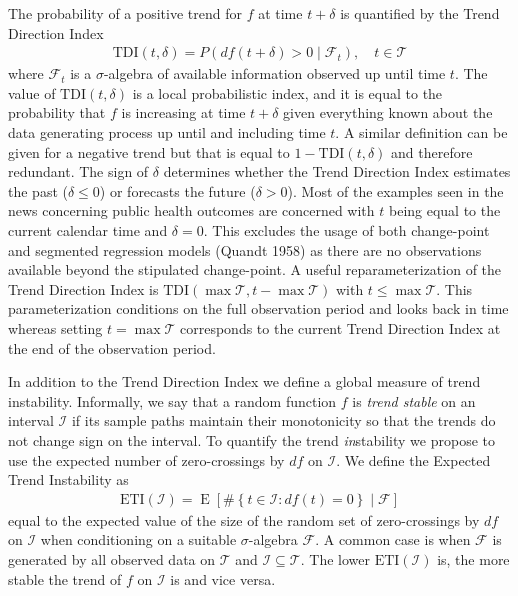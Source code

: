 \documentclass[
  11pt,
]{article}
\theoremstyle{nonumberplain}
\begin{document}
The probability of a positive trend for \(f\) at time \(t + \delta\) is
quantified by the Trend Direction Index \begin{align}
  \mathrm{TDI}(t, \delta) = P(df(t + \delta ) > 0 \mid \mathcal{F}_t), \quad t \in \mathcal{T}\label{eq:TCIdef}
\end{align} where \(\mathcal{F}_t\) is a \(\sigma\)-algebra of available
information observed up until time \(t\). The value of
\(\mathrm{TDI}(t, \delta)\) is a local probabilistic index, and it is
equal to the probability that \(f\) is increasing at time \(t + \delta\)
given everything known about the data generating process up until and
including time \(t\). A similar definition can be given for a negative
trend but that is equal to \(1 - \mathrm{TDI}(t, \delta)\) and therefore
redundant. The sign of \(\delta\) determines whether the Trend Direction
Index estimates the past (\(\delta \leq 0\)) or forecasts the future
(\(\delta > 0\)). Most of the examples seen in the news concerning
public health outcomes are concerned with \(t\) being equal to the
current calendar time and \(\delta = 0\). This excludes the usage of
both change-point and segmented regression models (Quandt 1958) as there
are no observations available beyond the stipulated change-point. A
useful reparameterization of the Trend Direction Index is
\(\mathrm{TDI}(\max \mathcal{T}, t - \max \mathcal{T})\) with
\(t \leq \max \mathcal{T}\). This parameterization conditions on the
full observation period and looks back in time whereas setting
\(t = \max \mathcal{T}\) corresponds to the current Trend Direction
Index at the end of the observation period.

In addition to the Trend Direction Index we define a global measure of
trend instability. Informally, we say that a random function \(f\) is
\textit{trend stable} on an interval \(\mathcal{I}\) if its sample paths
maintain their monotonicity so that the trends do not change sign on the
interval. To quantify the trend \emph{in}stability we propose to use the
expected number of zero-crossings by \(df\) on \(\mathcal{I}\). We
define the Expected Trend Instability as \begin{align}
  \text{ETI}(\mathcal{I}) = \mathop{\mathrm{E}}\left[\#\left\{t \in \mathcal{I} : df(t) = 0\right\} \mid \mathcal{F}\right]\label{eq:ETIdef}
\end{align} equal to the expected value of the size of the random set of
zero-crossings by \(df\) on \(\mathcal{I}\) when conditioning on a
suitable \(\sigma\)-algebra \(\mathcal{F}\). A common case is when
\(\mathcal{F}\) is generated by all observed data on \(\mathcal{T}\) and
\(\mathcal{I} \subseteq \mathcal{T}\). The lower
\(\text{ETI}(\mathcal{I})\) is, the more stable the trend of \(f\) on
\(\mathcal{I}\) is and vice versa.
\end{document}

